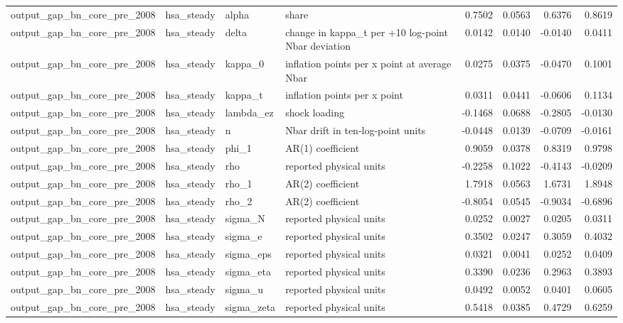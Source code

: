 \begin{tabular}{llllrrrr}
output\_gap\_bn\_core\_pre\_2008 & hsa\_steady & alpha & share & 0.7502 & 0.0563 & 0.6376 & 0.8619 \\
output\_gap\_bn\_core\_pre\_2008 & hsa\_steady & delta & change in kappa\_t per +10 log-point Nbar deviation & 0.0142 & 0.0140 & -0.0140 & 0.0411 \\
output\_gap\_bn\_core\_pre\_2008 & hsa\_steady & kappa\_0 & inflation points per x point at average Nbar & 0.0275 & 0.0375 & -0.0470 & 0.1001 \\
output\_gap\_bn\_core\_pre\_2008 & hsa\_steady & kappa\_t & inflation points per x point & 0.0311 & 0.0441 & -0.0606 & 0.1134 \\
output\_gap\_bn\_core\_pre\_2008 & hsa\_steady & lambda\_ez & shock loading & -0.1468 & 0.0688 & -0.2805 & -0.0130 \\
output\_gap\_bn\_core\_pre\_2008 & hsa\_steady & n & Nbar drift in ten-log-point units & -0.0448 & 0.0139 & -0.0709 & -0.0161 \\
output\_gap\_bn\_core\_pre\_2008 & hsa\_steady & phi\_1 & AR(1) coefficient & 0.9059 & 0.0378 & 0.8319 & 0.9798 \\
output\_gap\_bn\_core\_pre\_2008 & hsa\_steady & rho & reported physical units & -0.2258 & 0.1022 & -0.4143 & -0.0209 \\
output\_gap\_bn\_core\_pre\_2008 & hsa\_steady & rho\_1 & AR(2) coefficient & 1.7918 & 0.0563 & 1.6731 & 1.8948 \\
output\_gap\_bn\_core\_pre\_2008 & hsa\_steady & rho\_2 & AR(2) coefficient & -0.8054 & 0.0545 & -0.9034 & -0.6896 \\
output\_gap\_bn\_core\_pre\_2008 & hsa\_steady & sigma\_N & reported physical units & 0.0252 & 0.0027 & 0.0205 & 0.0311 \\
output\_gap\_bn\_core\_pre\_2008 & hsa\_steady & sigma\_e & reported physical units & 0.3502 & 0.0247 & 0.3059 & 0.4032 \\
output\_gap\_bn\_core\_pre\_2008 & hsa\_steady & sigma\_eps & reported physical units & 0.0321 & 0.0041 & 0.0252 & 0.0409 \\
output\_gap\_bn\_core\_pre\_2008 & hsa\_steady & sigma\_eta & reported physical units & 0.3390 & 0.0236 & 0.2963 & 0.3893 \\
output\_gap\_bn\_core\_pre\_2008 & hsa\_steady & sigma\_u & reported physical units & 0.0492 & 0.0052 & 0.0401 & 0.0605 \\
output\_gap\_bn\_core\_pre\_2008 & hsa\_steady & sigma\_zeta & reported physical units & 0.5418 & 0.0385 & 0.4729 & 0.6259 \\

\end{tabular}
